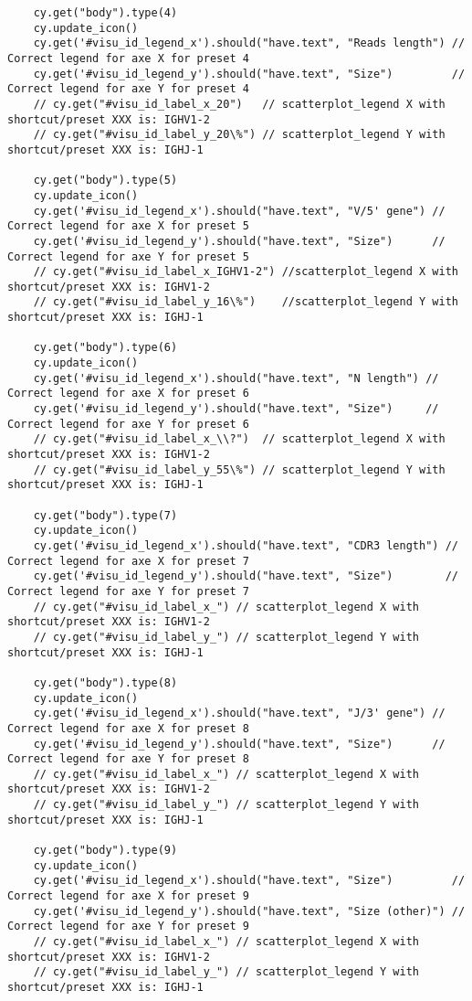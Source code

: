 \begin{verbatim}
    cy.get("body").type(4)
    cy.update_icon()
    cy.get('#visu_id_legend_x').should("have.text", "Reads length") // Correct legend for axe X for preset 4
    cy.get('#visu_id_legend_y').should("have.text", "Size")         // Correct legend for axe Y for preset 4
    // cy.get("#visu_id_label_x_20")   // scatterplot_legend X with shortcut/preset XXX is: IGHV1-2
    // cy.get("#visu_id_label_y_20\%") // scatterplot_legend Y with shortcut/preset XXX is: IGHJ-1

    cy.get("body").type(5)
    cy.update_icon()
    cy.get('#visu_id_legend_x').should("have.text", "V/5' gene") // Correct legend for axe X for preset 5
    cy.get('#visu_id_legend_y').should("have.text", "Size")      // Correct legend for axe Y for preset 5
    // cy.get("#visu_id_label_x_IGHV1-2") //scatterplot_legend X with shortcut/preset XXX is: IGHV1-2
    // cy.get("#visu_id_label_y_16\%")    //scatterplot_legend Y with shortcut/preset XXX is: IGHJ-1

    cy.get("body").type(6)
    cy.update_icon()
    cy.get('#visu_id_legend_x').should("have.text", "N length") // Correct legend for axe X for preset 6
    cy.get('#visu_id_legend_y').should("have.text", "Size")     // Correct legend for axe Y for preset 6
    // cy.get("#visu_id_label_x_\\?")  // scatterplot_legend X with shortcut/preset XXX is: IGHV1-2
    // cy.get("#visu_id_label_y_55\%") // scatterplot_legend Y with shortcut/preset XXX is: IGHJ-1

    cy.get("body").type(7)
    cy.update_icon()
    cy.get('#visu_id_legend_x').should("have.text", "CDR3 length") // Correct legend for axe X for preset 7
    cy.get('#visu_id_legend_y').should("have.text", "Size")        // Correct legend for axe Y for preset 7
    // cy.get("#visu_id_label_x_") // scatterplot_legend X with shortcut/preset XXX is: IGHV1-2
    // cy.get("#visu_id_label_y_") // scatterplot_legend Y with shortcut/preset XXX is: IGHJ-1

    cy.get("body").type(8)
    cy.update_icon()
    cy.get('#visu_id_legend_x').should("have.text", "J/3' gene") // Correct legend for axe X for preset 8
    cy.get('#visu_id_legend_y').should("have.text", "Size")      // Correct legend for axe Y for preset 8
    // cy.get("#visu_id_label_x_") // scatterplot_legend X with shortcut/preset XXX is: IGHV1-2
    // cy.get("#visu_id_label_y_") // scatterplot_legend Y with shortcut/preset XXX is: IGHJ-1

    cy.get("body").type(9)
    cy.update_icon()
    cy.get('#visu_id_legend_x').should("have.text", "Size")         // Correct legend for axe X for preset 9
    cy.get('#visu_id_legend_y').should("have.text", "Size (other)") // Correct legend for axe Y for preset 9
    // cy.get("#visu_id_label_x_") // scatterplot_legend X with shortcut/preset XXX is: IGHV1-2
    // cy.get("#visu_id_label_y_") // scatterplot_legend Y with shortcut/preset XXX is: IGHJ-1


\end{verbatim}
